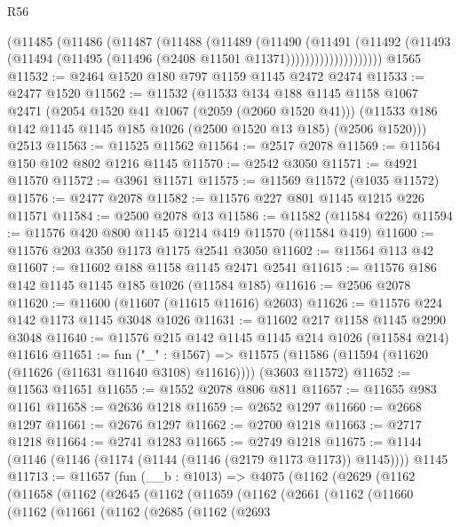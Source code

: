 \begin{lexlean}{R56}
\begin{coremodule}
                  (@11485
                    (@11486
                      (@11487
                        (@11488
                          (@11489
                            (@11490
                              (@11491
                                (@11492
                                  (@11493
                                    (@11494 (@11495 (@11496 (@2408 @11501 @11371))))))))))))))))))))
    @1565
@11532 := @2464 @1520 @180 @797 @1159 @1145 @2472 @2474
@11533 := @2477 @1520
@11562 := @11532
    (@11533
      @134
      @188
      @1145
      @1158
      @1067
      @2471
      (@2054 @1520 @41 @1067 (@2059 (@2060 @1520 @41)))
      (@11533 @186 @142 @1145 @1145 @185 @1026 (@2500 @1520 @13 @185) (@2506 @1520)))
    @2513
@11563 := @11525 @11562
@11564 := @2517 @2078
@11569 := @11564 @150 @102 @802 @1216 @1145
@11570 := @2542 @3050
@11571 := @4921 @11570
@11572 := @3961 @11571
@11575 := @11569 @11572 (@1035 @11572)
@11576 := @2477 @2078
@11582 := @11576 @227 @801 @1145 @1215 @226 @11571
@11584 := @2500 @2078 @13
@11586 := @11582 (@11584 @226)
@11594 := @11576 @420 @800 @1145 @1214 @419 @11570 (@11584 @419)
@11600 := @11576 @203 @350 @1173 @1175 @2541 @3050
@11602 := @11564 @113 @42
@11607 := @11602 @188 @1158 @1145 @2471 @2541
@11615 := @11576 @186 @142 @1145 @1145 @185 @1026 (@11584 @185)
@11616 := @2506 @2078
@11620 := @11600 (@11607 (@11615 @11616) @2603)
@11626 := @11576 @224 @142 @1173 @1145 @3048 @1026
@11631 := @11602 @217 @1158 @1145 @2990 @3048
@11640 := @11576 @215 @142 @1145 @1145 @214 @1026 (@11584 @214) @11616
@11651 := fun ("_" : @1567) =>
  @11575 (@11586 (@11594 (@11620 (@11626 (@11631 @11640 @3108) @11616)))) (@3603 @11572)
@11652 := @11563 @11651
@11655 := @1552 @2078 @806 @811
@11657 := @11655 @983 @1161
@11658 := @2636 @1218
@11659 := @2652 @1297
@11660 := @2668 @1297
@11661 := @2676 @1297
@11662 := @2700 @1218
@11663 := @2717 @1218
@11664 := @2741 @1283
@11665 := @2749 @1218
@11675 := @1144 (@1146 (@1146 (@1174 (@1144 (@1146 (@2179 @1173 @1173)) @1145)))) @1145
@11713 := @11657
    (fun (__b : @1013) =>
    @4075
      (@1162
        (@2629
          (@1162
            (@11658
              (@1162
                (@2645
                  (@1162
                    (@11659
                      (@1162
                        (@2661
                          (@1162
                            (@11660
                              (@1162
                                (@11661
                                  (@1162
                                    (@2685
                                      (@1162
                                        (@2693

\end{coremodule}
\end{lexlean}
